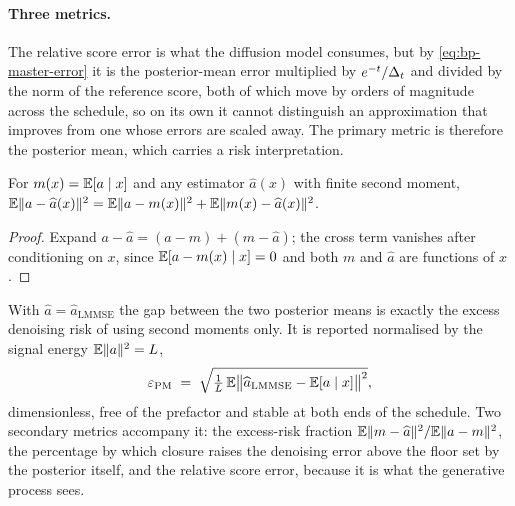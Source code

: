 \paragraph{Three metrics.} The relative score error is what the diffusion
model consumes, but by \eqref{eq:bp-master-error} it is the posterior-mean
error multiplied by $e^{-t}/\Delta_t$ and divided by the norm of the reference
score, both of which move by orders of magnitude across the schedule, so on
its own it cannot distinguish an approximation that improves from one whose
errors are scaled away. The primary metric is therefore the posterior mean,
which carries a risk interpretation.

\begin{proposition}\label{prop:l-excess}
For $m(x) = \mathbb{E}[a\mid x]$ and any estimator $\widehat a(x)$ with finite second
moment,
$\mathbb{E}\|a - \widehat a(x)\|^2 = \mathbb{E}\|a - m(x)\|^2 + \mathbb{E}\|m(x) - \widehat a(x)\|^2$.
\end{proposition}

\begin{proof}
Expand $a - \widehat a = (a-m) + (m - \widehat a)$; the cross term vanishes
after conditioning on $x$, since $\mathbb{E}[a - m(x)\mid x] = 0$ and both $m$ and
$\widehat a$ are functions of $x$.
\end{proof}

\noindent With $\widehat a = \widehat a_{\mathrm{LMMSE}}$ the gap between the
two posterior means is exactly the excess denoising risk of using second
moments only. It is reported normalised by the signal energy
$\mathbb{E}\|a\|^2 = L$,
\begin{equation}
  \varepsilon_{\mathrm{PM}}
  \;=\;
  \sqrt{\tfrac{1}{L}\,
        \mathbb{E}\big\| \widehat a_{\mathrm{LMMSE}} - \mathbb{E}[a \mid x] \big\|^2 } ,
  \label{eq:l-epspm}
\end{equation}
dimensionless, free of the prefactor and stable at both ends of the schedule.
Two secondary metrics accompany it: the excess-risk fraction
$\mathbb{E}\|m - \widehat a\|^2/\mathbb{E}\|a - m\|^2$, the percentage by which closure raises
the denoising error above the floor set by the posterior itself, and the
relative score error, because it is what the generative process sees.

